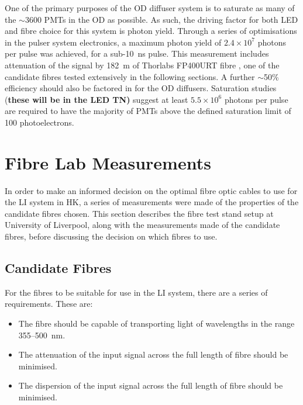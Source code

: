 \documentclass[a4paper,11pt]{article}
\let\oldsim\sim
\renewcommand{\sim}{{\oldsim}}
\begin{document}
One of the primary purposes of the OD diffuser system is to saturate as many of the $\sim3600$ PMTs in the OD as possible. As such, the driving factor for both LED and fibre choice for this system is photon yield. Through a series of optimisations in the pulser system electronics, a maximum photon yield of $2.4\times10^{7}$ photons per pulse was achieved, for a sub-10~ns pulse. This measurement includes attenuation of the signal by 182~m of Thorlabs FP400URT fibre \cite{bib:fp400urt}, one of the candidate fibres tested extensively in the following sections. A further $\sim$50\% efficiency should also be factored in for the OD diffusers. Saturation studies ({\bf these will be in the LED TN)} suggest at least $5.5\times10^6$ photons per pulse are required to have the majority of PMTs above the defined saturation limit of 100 photoelectrons.


\section{Fibre Lab Measurements}

In order to make an informed decision on the optimal fibre optic cables to use for the LI system in HK, a series of measurements were made of the properties of the candidate fibres chosen. This section describes the fibre test stand setup at University of Liverpool, along with the measurements made of the candidate fibres, before discussing the decision on which fibres to use.

\subsection{Candidate Fibres}

For the fibres to be suitable for use in the LI system, there are a series of requirements. These are:
\begin{itemize}
\item The fibre should be capable of transporting light of wavelengths in the range 355--500~nm.
\item The attenuation of the input signal across the full length of fibre should be minimised.
\item The dispersion of the input signal across the full length of fibre should be minimised.
\end{itemize}
\end{document}
